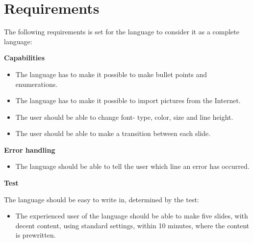 \section{Requirements}
The following requirements is set for the language to consider it as a complete language:

\textbf{Capabilities}\\
\begin{itemize}
\item The language has to make it possible to make bullet points and enumerations.
\item The language has to make it possible to import pictures from the Internet.
\item The user should be able to change font- type, color, size and line height.
\item The user should be able to make a transition between each slide. 
\end{itemize}
\textbf{Error handling}\\
\begin{itemize}
\item The language should be able to tell the user which line an error has occurred. 
\end{itemize}
\textbf{Test}\\
\item The language should be easy to write in, determined by the test:
\begin{itemize}
\item The experienced user of the language should be able to make five slides, with decent content, using standard settings, within 10 minutes, where the content is prewritten.
\end{itemize}